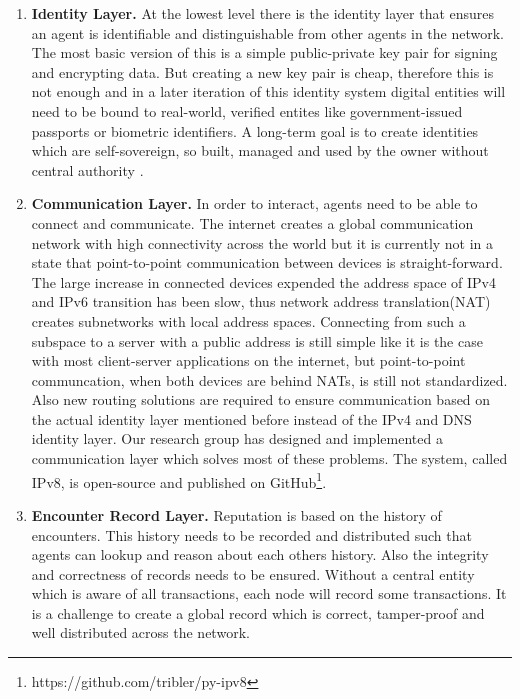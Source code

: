 \begin{enumerate}
    \item \textbf{Identity Layer.} At the lowest level there is the identity layer that ensures an agent is 
    identifiable and distinguishable from other agents in the network. The most basic version of this is 
    a simple public-private key pair for signing and encrypting data. But creating a new key pair is cheap, therefore 
    this is not enough and in a later iteration of this identity system digital entities will need to be 
    bound to real-world, verified entites like government-issued passports or biometric identifiers. A long-term
    goal is to create identities which are self-sovereign, so built, managed and used by the owner without 
    central authority \cite{stokkink2018deployment}.

    \item \textbf{Communication Layer.} In order to interact, agents need to be able to connect and communicate.
    The internet creates a global communication network with high connectivity
    across the world but it is currently not in a state that point-to-point communication between devices is 
    straight-forward. The large increase in connected devices expended the address space of IPv4 and IPv6
    transition has been slow, thus network address translation(NAT) creates subnetworks with local address 
    spaces. Connecting from such a subspace to a server with a public address is still simple like it is
    the case with most client-server applications on the internet, but point-to-point communcation, when both 
    devices are behind NATs, is still not standardized. Also new routing solutions are required to ensure
    communication based on the actual identity layer mentioned before instead of the IPv4 and DNS identity
    layer. Our research group has designed and implemented a communication layer which solves most of 
    these problems. The system, called IPv8, is open-source and published on GitHub\footnote{https://github.com/tribler/py-ipv8}.

    \item \textbf{Encounter Record Layer.} Reputation is based on the history of encounters. This history needs 
    to be recorded and distributed such that agents can lookup and reason about each others history. Also
    the integrity and correctness of records needs to be ensured. Without a central entity
    which is aware of all transactions, each node will record some transactions. It is a challenge to 
    create a global record which is correct, tamper-proof and well distributed across the network.


\end{enumerate}
